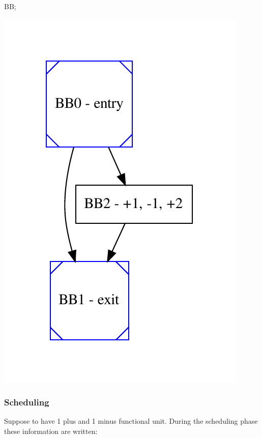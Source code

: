 \begin{DoxyItemize}
\item BB; 
\begin{DoxyImageNoCaption}
  \mbox{\includegraphics[width=\textwidth,height=\textheight/2,keepaspectratio=true]{dot_inline_dotgraph_23}}
\end{DoxyImageNoCaption}
 
\end{DoxyItemize}\hypertarget{src_HLS_page_Scheduling}{}\subsubsection{Scheduling}\label{src_HLS_page_Scheduling}
Suppose to have 1 plus and 1 minus functional unit. During the scheduling phase these information are written\+:
